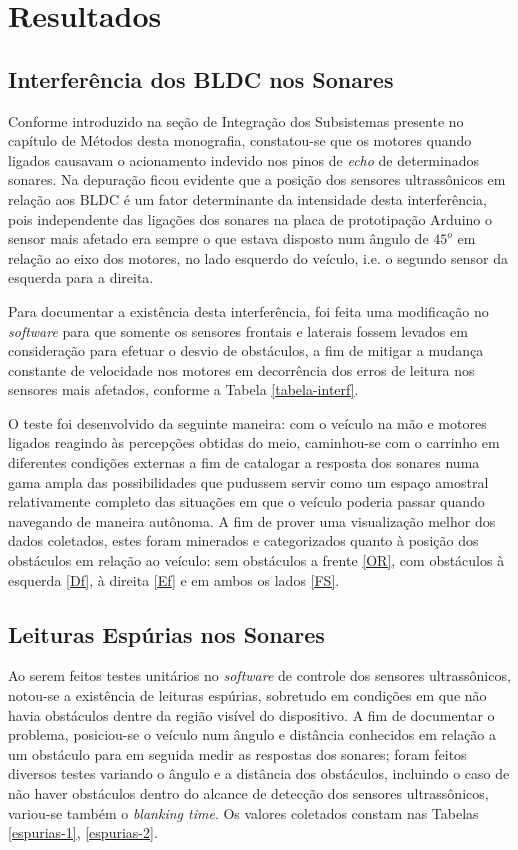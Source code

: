 \chapter{Resultados}

\section{Interferência dos BLDC nos Sonares}
Conforme introduzido na seção de Integração dos Subsistemas presente no capítulo de Métodos desta monografia, 
constatou-se que os motores quando ligados causavam o acionamento indevido nos pinos de \textit{echo} de determinados sonares.
Na depuração ficou evidente que a posição dos sensores ultrassônicos em relação aos BLDC é um fator determinante da intensidade desta interferência, 
pois independente das ligações dos sonares na placa de prototipação Arduino o sensor mais afetado era sempre o que estava disposto num ângulo de 
$45^o$ em relação ao eixo dos motores, no lado esquerdo do veículo, i.e. o segundo sensor da esquerda para a direita.

Para documentar a existência desta interferência, foi feita uma modificação no \textit{software} para que somente os sensores frontais e laterais 
fossem levados em consideração para efetuar o desvio de obstáculos, a fim de mitigar a mudança constante de velocidade nos motores em decorrência dos 
erros de leitura nos sensores mais afetados, conforme  a Tabela \ref{tabela-interf}.

O teste foi desenvolvido da seguinte maneira: com o veículo na mão e motores ligados reagindo às percepções obtidas do meio, caminhou-se com o 
carrinho em diferentes condições externas a fim de catalogar a resposta dos sonares numa gama ampla das possibilidades que pudussem servir como um 
espaço amostral relativamente completo das situações em que o veículo poderia passar quando navegando de maneira autônoma. 
A fim de prover uma visualização melhor dos dados coletados, estes foram minerados e categorizados quanto à posição dos obstáculos em relação ao 
veículo: sem obstáculos a frente \ref{OR}, com obstáculos à esquerda \ref{Df}, à direita \ref{Ef} e em ambos os lados \ref{FS}.

\section{Leituras Espúrias nos Sonares}
Ao serem feitos testes unitários no \textit{software} de controle dos sensores ultrassônicos, notou-se a existência de leituras espúrias, sobretudo 
em condições em que não havia obstáculos dentre da região visível do dispositivo.
A fim de documentar o problema, posiciou-se o veículo num ângulo e distância conhecidos em relação a um obstáculo para em seguida medir as respostas 
dos sonares; foram feitos diversos testes variando o ângulo e a distância dos obstáculos, incluindo o caso de não haver obstáculos dentro do 
alcance de detecção dos sensores ultrassônicos, variou-se também o \textit{blanking time}.
Os valores coletados constam nas Tabelas \ref{espurias-1}, \ref{espurias-2}.

